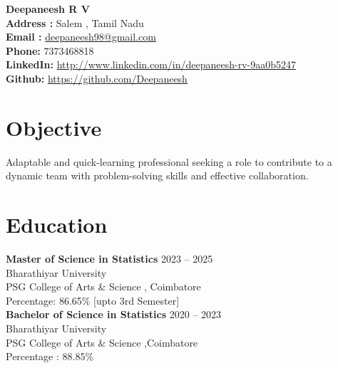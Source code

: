 \documentclass[a4paper,11pt]{article}
\begin{document}
	
	\begin{flushleft}
		{\LARGE \textbf{Deepaneesh R V}} \\
		\textbf{Address :} Salem , Tamil Nadu \\
		\textbf{Email :} \url{deepaneesh98@gmail.com}\\
		\textbf{Phone:} 7373468818 \\
		\textbf{LinkedIn:} \url{http://www.linkedin.com/in/deepaneesh-rv-9aa0b5247} \\
		\textbf{Github:} \url{https://github.com/Deepaneesh} \\
	\end{flushleft}
	
	\section*{Objective}
	Adaptable and quick-learning professional seeking a role to contribute to a dynamic team with problem-solving skills and effective collaboration.
	
	\section*{Education}
	\noindent
	\textbf{Master of Science in Statistics} \hfill 2023 -- 2025 \\
	Bharathiyar University \\
	PSG College of Arts \& Science , Coimbatore \\
	 Percentage: 86.65\% [upto 3rd Semester] \\[0.1mm]
	
	\textbf{Bachelor of Science in Statistics} \hfill 2020 -- 2023 \\
	Bharathiyar University \\
	PSG College of Arts \& Science ,Coimbatore\\
	Percentage : 88.85\% \\[0.01mm]
	
\end{document}
